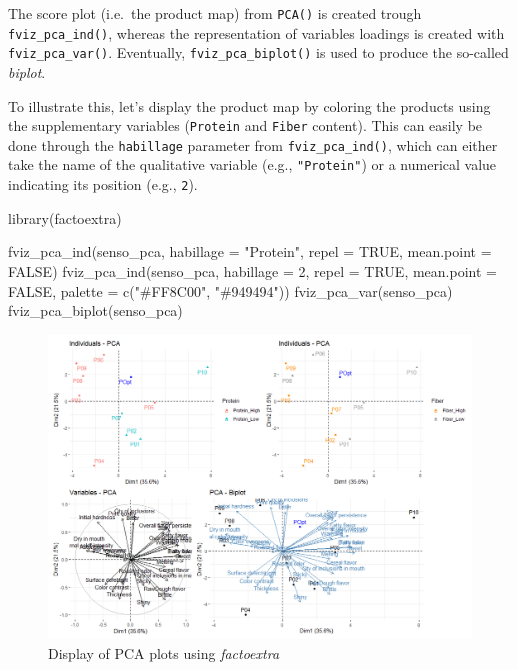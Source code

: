 \documentclass[
]{krantz}
\makeatletter
\newenvironment{Shaded}{\begin{snugshade}}{\end{snugshade}}
\newcommand{\AttributeTok}[1]{\textcolor[rgb]{0.61,0.61,0.61}{#1}}
\newcommand{\ConstantTok}[1]{\textcolor[rgb]{0,0,0}{#1}}
\newcommand{\DecValTok}[1]{\textcolor[rgb]{0.06,0.06,0.06}{#1}}
\newcommand{\FunctionTok}[1]{\textcolor[rgb]{0,0,0}{#1}}
\newcommand{\NormalTok}[1]{#1}
\newcommand{\StringTok}[1]{\textcolor[rgb]{0.5,0.5,0.5}{#1}}
\newenvironment{kframe}{%
\medskip{}
\setlength{\fboxsep}{.8em}
 \def\at@end@of@kframe{}%
 \ifinner\ifhmode%
  \def\at@end@of@kframe{\end{minipage}}%
  \begin{minipage}{\columnwidth}%
 \fi\fi%
 \def\FrameCommand##1{\hskip\@totalleftmargin \hskip-\fboxsep
 \colorbox{shadecolor}{##1}\hskip-\fboxsep
     \hskip-\linewidth \hskip-\@totalleftmargin \hskip\columnwidth}%
 \MakeFramed {\advance\hsize-\width
   \@totalleftmargin\z@ \linewidth\hsize
   \@setminipage}}%
 {\par\unskip\endMakeFramed%
 \at@end@of@kframe}
\renewenvironment{Shaded}{\begin{kframe}}{\end{kframe}}
\makeatother
\begin{document}
The score plot (i.e.~the product map) from \texttt{PCA()} is created trough \texttt{fviz\_pca\_ind()}, whereas the representation of variables loadings is created with \texttt{fviz\_pca\_var()}. Eventually, \texttt{fviz\_pca\_biplot()} is used to produce the so-called \emph{biplot}.

To illustrate this, let's display the product map by coloring the products using the supplementary variables (\texttt{Protein} and \texttt{Fiber} content). This can easily be done through the \texttt{habillage} parameter from \texttt{fviz\_pca\_ind()}, which can either take the name of the qualitative variable (e.g., \texttt{"Protein"}) or a numerical value indicating its position (e.g., \texttt{2}).

\begin{Shaded}
\begin{Highlighting}[]
\FunctionTok{library}\NormalTok{(factoextra)}

\FunctionTok{fviz\_pca\_ind}\NormalTok{(senso\_pca, }\AttributeTok{habillage =} \StringTok{"Protein"}\NormalTok{, }\AttributeTok{repel =} \ConstantTok{TRUE}\NormalTok{, }\AttributeTok{mean.point =} \ConstantTok{FALSE}\NormalTok{)}
\FunctionTok{fviz\_pca\_ind}\NormalTok{(senso\_pca, }\AttributeTok{habillage =} \DecValTok{2}\NormalTok{, }\AttributeTok{repel =} \ConstantTok{TRUE}\NormalTok{, }\AttributeTok{mean.point =} \ConstantTok{FALSE}\NormalTok{,}
             \AttributeTok{palette =} \FunctionTok{c}\NormalTok{(}\StringTok{"\#FF8C00"}\NormalTok{, }\StringTok{"\#949494"}\NormalTok{))}
\FunctionTok{fviz\_pca\_var}\NormalTok{(senso\_pca)}
\FunctionTok{fviz\_pca\_biplot}\NormalTok{(senso\_pca)}
\end{Highlighting}
\end{Shaded}

\begin{figure}
\includegraphics[width=15.86in]{images/PCA_patchwork} \caption{Display of PCA plots using \textit{factoextra}}\label{fig:unnamed-chunk-267}
\end{figure}
\end{document}
